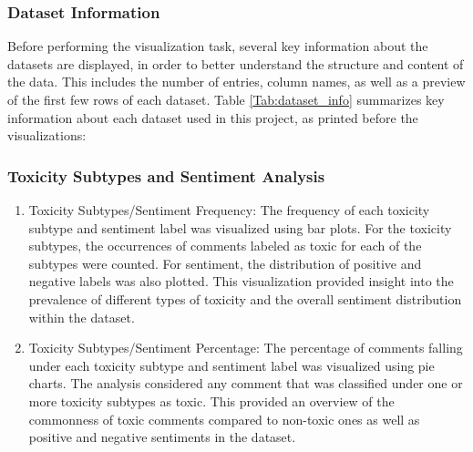 \documentclass[10pt,a4paper,oneside]{article} %
\begin{document}
\subsubsection{Dataset Information}
Before performing the visualization task, several key information about the datasets are displayed, in order to better understand the structure and content of the data. This includes the number of entries, column names, as well as a preview of the first few rows of each dataset.
Table \ref{Tab:dataset_info} summarizes key information about each dataset used in this project, as printed before the visualizations:
\begin{table}[h!]
\centering
{}
\caption{Dataset Information}
\label{Tab:dataset_info}
\end{table}

\subsubsection{Toxicity Subtypes and Sentiment Analysis}
\begin{enumerate}
    \item Toxicity Subtypes/Sentiment Frequency: The frequency of each toxicity subtype and sentiment label was visualized using bar plots. For the toxicity subtypes, the occurrences of comments labeled as toxic for each of the subtypes were counted. For sentiment, the distribution of positive and negative labels was also plotted. This visualization provided insight into the prevalence of different types of toxicity and the overall sentiment distribution within the dataset.
    \item Toxicity Subtypes/Sentiment Percentage: The percentage of comments falling under each toxicity subtype and sentiment label was visualized using pie charts. The analysis considered any comment that was classified under one or more toxicity subtypes as toxic. This provided an overview of the commonness of toxic comments compared to non-toxic ones as well as positive and negative sentiments in the dataset.
\end{enumerate}
\end{document}
